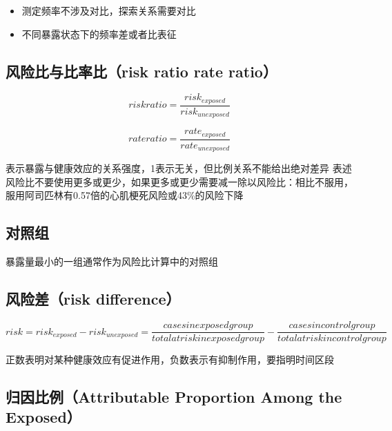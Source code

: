 \documentclass[]{book}
\providecommand{\tightlist}{%
  \setlength{\itemsep}{0pt}\setlength{\parskip}{0pt}}
\begin{document}
\begin{itemize}
\tightlist
\item
  测定频率不涉及对比，探索关系需要对比
\item
  不同暴露状态下的频率差或者比表征
\end{itemize}

\hypertarget{ux98ceux9669ux6bd4ux4e0eux6bd4ux7387ux6bd4risk-ratio-rate-ratio}{%
\subsection{风险比与比率比（risk ratio rate ratio）}\label{ux98ceux9669ux6bd4ux4e0eux6bd4ux7387ux6bd4risk-ratio-rate-ratio}}

\[risk ratio = \frac{risk_{exposed}}{risk_{unexposed}}\]

\[rate ratio = \frac{rate_{exposed}}{rate_{unexposed}}\]

表示暴露与健康效应的关系强度，1表示无关，但比例关系不能给出绝对差异
表述风险比不要使用更多或更少，如果更多或更少需要减一除以风险比：相比不服用，服用阿司匹林有0.57倍的心肌梗死风险或43\%的风险下降

\hypertarget{ux5bf9ux7167ux7ec4}{%
\subsection{对照组}\label{ux5bf9ux7167ux7ec4}}

暴露量最小的一组通常作为风险比计算中的对照组

\hypertarget{ux98ceux9669ux5deerisk-difference}{%
\subsection{风险差（risk difference）}\label{ux98ceux9669ux5deerisk-difference}}

\[risk = risk_{exposed} - risk_{unexposed} = \frac{cases in exposed group}{total at risk in exposed group} - \frac{cases in control group}{total at risk in control group}\]

正数表明对某种健康效应有促进作用，负数表示有抑制作用，要指明时间区段

\hypertarget{ux5f52ux56e0ux6bd4ux4f8battributable-proportion-among-the-exposed}{%
\subsection{归因比例（Attributable Proportion Among the Exposed）}\label{ux5f52ux56e0ux6bd4ux4f8battributable-proportion-among-the-exposed}}
\end{document}
